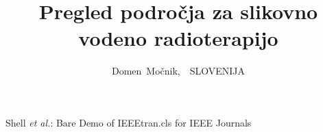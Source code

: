 \documentclass[journal]{IEEEtran}
\begin{document}
%
\title{Pregled področja za slikovno\\ vodeno radioterapijo}
%
%
%

\author{Domen~Močnik,~~SLOVENIJA}%

% 
%



%
{Shell \MakeLowercase{\textit{et al.}}: Bare Demo of IEEEtran.cls for IEEE Journals}
% 
\end{document}
